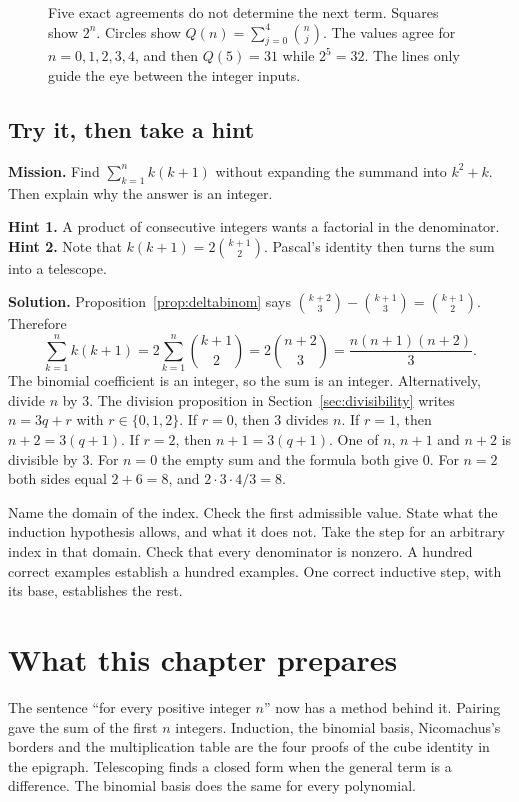 \begin{figure}[ht]\centering{}
\caption{Five exact agreements do not determine the next term. Squares show $2^n$. Circles show $Q(n)=\sum_{j=0}^4\binom nj$. The values agree for $n=0,1,2,3,4$, and then $Q(5)=31$ while $2^5=32$. The lines only guide the eye between the integer inputs.}
\label{fig:pattern}
\end{figure}

\subsection*{Try it, then take a hint}
\textbf{Mission.} Find $\sum_{k=1}^n k(k+1)$ without expanding the summand into $k^2+k$. Then explain why the answer is an integer.

\textbf{Hint 1.} A product of consecutive integers wants a factorial in the denominator. \textbf{Hint 2.} Note that $k(k+1)=2\binom{k+1}{2}$. Pascal's identity then turns the sum into a telescope.

\textbf{Solution.} Proposition~\ref{prop:deltabinom} says $\binom{k+2}{3}-\binom{k+1}{3}=\binom{k+1}{2}$. Therefore
\[
\sum_{k=1}^n k(k+1)=2\sum_{k=1}^n\binom{k+1}{2}=2\binom{n+2}{3}=\frac{n(n+1)(n+2)}{3}.
\]
The binomial coefficient is an integer, so the sum is an integer. Alternatively, divide $n$ by $3$. The division proposition in Section~\ref{sec:divisibility} writes $n=3q+r$ with $r\in\{0,1,2\}$. If $r=0$, then $3$ divides $n$. If $r=1$, then $n+2=3(q+1)$. If $r=2$, then $n+1=3(q+1)$. One of $n$, $n+1$ and $n+2$ is divisible by $3$. For $n=0$ the empty sum and the formula both give $0$. For $n=2$ both sides equal $2+6=8$, and $2\cdot3\cdot4/3=8$.

\begin{reminder}
Name the domain of the index. Check the first admissible value. State what the induction hypothesis allows, and what it does not. Take the step for an arbitrary index in that domain. Check that every denominator is nonzero. A hundred correct examples establish a hundred examples. One correct inductive step, with its base, establishes the rest.
\end{reminder}

\section*{What this chapter prepares}
The sentence ``for every positive integer $n$'' now has a method behind it. Pairing gave the sum of the first $n$ integers. Induction, the binomial basis, Nicomachus's borders and the multiplication table are the four proofs of the cube identity in the epigraph. Telescoping finds a closed form when the general term is a difference. The binomial basis does the same for every polynomial.

